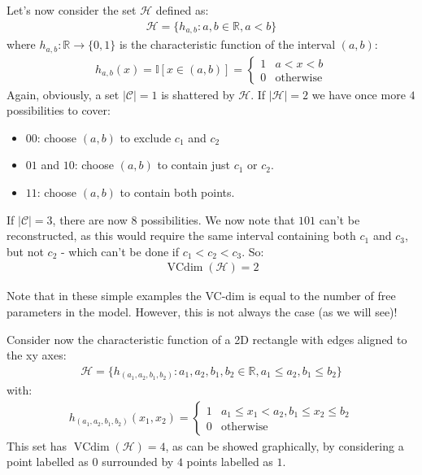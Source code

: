 \documentclass[../template.tex]{subfiles}
\begin{document}
\begin{example}
    Let's now consider the set $\mathcal{H}$ defined as:
    \begin{align*}
        \mathcal{H}= \{h_{a,b}\colon a,b \in \mathbb{R}, a < b\}
    \end{align*} 
    where $h_{a,b} \colon \mathbb{R} \to \{0,1\}$ is the characteristic function of the interval $(a,b)$:
    \begin{align*}
        h_{a,b}(x) = \mathbb{I}[x \in (a,b)] = \begin{cases}
            1 & a < x < b\\
            0 & \text{otherwise}
        \end{cases}
    \end{align*}  
    Again, obviously, a set $|\mathcal{C}|=1$ is shattered by $\mathcal{H}$. If $|\mathcal{H}|=2$ we have once more $4$ possibilities to cover:
    \begin{itemize}
        \item $00$: choose $(a,b)$ to exclude $c_1$ and $c_2$
        \item $01$ and $10$: choose $(a,b)$ to contain just $c_1$ or $c_2$.
        \item $11$: choose $(a,b)$ to contain both points.           
    \end{itemize}
    If $|\mathcal{C}|=3$, there are now $8$ possibilities. We now note that $101$ can't be reconstructed, as this would require the same interval containing both $c_1$ and $c_3$, but not $c_2$ - which can't be done if $c_1 < c_2 < c_3$. So:
    \begin{align*}
        \operatorname{VCdim}(\mathcal{H}) = 2 
    \end{align*}   
\end{example}

Note that in these simple examples the VC-dim is equal to the number of free parameters in the model. However, this is not always the case (as we will see)!

\begin{example}
    Consider now the characteristic function of a 2D rectangle with edges aligned to the xy axes:
    \begin{align*}
        \mathcal{H} = \{h_{(a_1, a_2, b_1 , b_2 )}\colon a_1 , a_2 , b_1 , b_2 \in \mathbb{R}, a_1 \leq a_2, b_1 \leq b_2 \}
    \end{align*}
    with:
    \begin{align*}
        h_{(a_1 , a_2 , b_1 , b_2 )}(x_1 , x_2 ) = \begin{cases}
            1 & a_1 \leq x_1 < a_2, b_1 \leq x_2 \leq b_2\\
            0 & \text{otherwise}  
        \end{cases}
    \end{align*}
    This set has $\operatorname{VCdim}(\mathcal{H}) = 4$, as can be showed graphically, by considering a point labelled as $0$ surrounded by $4$ points labelled as $1$.   
\end{example}
\end{document}

